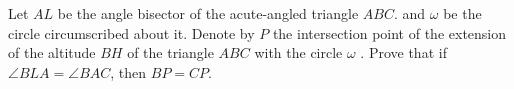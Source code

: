 Let $AL$ be the angle bisector of the acute-angled triangle $ABC$. and $\omega$ be the circle circumscribed about it. Denote by $P$ the intersection point of the extension of the altitude $BH$ of the triangle $ABC$ with the circle $\omega$ . Prove that if $\angle BLA= \angle BAC$, then $BP = CP$.